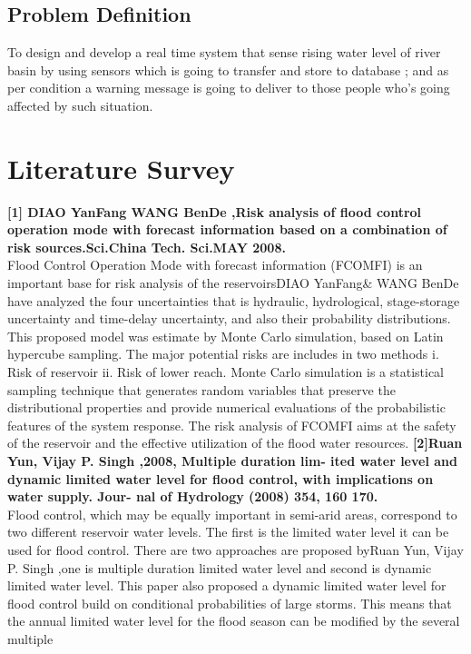 \documentclass[a4paper,12pt]{report}
\begin{document}
\begin{itemize}
\section{Problem Definition}
To design and develop a real time system that sense rising water level of river basin by using sensors which is going to transfer and store to database ; and as per condition a warning message is going to deliver to those people who’s going affected by such situation.



\chapter {Literature Survey}
\textbf{[1] DIAO YanFang WANG BenDe ,Risk analysis of flood
control operation mode with forecast information based
on a combination of risk sources.Sci.China Tech.
Sci.MAY 2008.}\\
Flood Control Operation Mode with forecast information (FCOMFI) is an important base for risk analysis
of the reservoirsDIAO YanFang& WANG BenDe have analyzed the four uncertainties that is hydraulic, hydrological,
stage-storage uncertainty and time-delay uncertainty, and also their probability distributions. This proposed model was
estimate by Monte Carlo simulation, based on Latin hypercube sampling. The major potential risks are includes in two
methods i. Risk of reservoir ii. Risk of lower reach. Monte Carlo simulation is a statistical sampling technique that
generates random variables that preserve the distributional properties and provide numerical evaluations of the
probabilistic features of the system response. The risk analysis of FCOMFI aims at the safety of the reservoir and the
effective utilization of the flood water resources.
\textbf{[2]Ruan Yun, Vijay P. Singh ,2008, Multiple duration lim-
ited water level and dynamic limited water level for
flood control, with implications on water supply. Jour-
nal of Hydrology (2008) 354, 160 170.}\\
 Flood control, which may be equally important in semi-arid areas, correspond to two different reservoir
water levels. The first is the limited water level it can be used for flood control. There are two approaches are proposed
byRuan Yun, Vijay P. Singh ,one is multiple duration limited water level and second is dynamic limited water level.
This paper also proposed a dynamic limited water level for flood control build on conditional probabilities of large
storms. This means that the annual limited water level for the flood season can be modified by the several multiple

\end{itemize}
\end{document}
